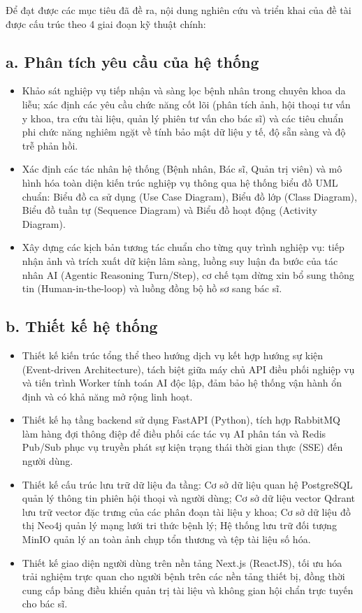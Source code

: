 Để đạt được các mục tiêu đã đề ra, nội dung nghiên cứu và triển khai của đề tài được cấu trúc theo 4 giai đoạn kỹ thuật chính:

\subsection*{a. Phân tích yêu cầu của hệ thống}
\begin{itemize}
  \item Khảo sát nghiệp vụ tiếp nhận và sàng lọc bệnh nhân trong chuyên khoa da liễu; xác định các yêu cầu chức năng cốt lõi (phân tích ảnh, hội thoại tư vấn y khoa, tra cứu tài liệu, quản lý phiên tư vấn cho bác sĩ) và các tiêu chuẩn phi chức năng nghiêm ngặt về tính bảo mật dữ liệu y tế, độ sẵn sàng và độ trễ phản hồi.
  \item Xác định các tác nhân hệ thống (Bệnh nhân, Bác sĩ, Quản trị viên) và mô hình hóa toàn diện kiến trúc nghiệp vụ thông qua hệ thống biểu đồ UML chuẩn: Biểu đồ ca sử dụng (Use Case Diagram), Biểu đồ lớp (Class Diagram), Biểu đồ tuần tự (Sequence Diagram) và Biểu đồ hoạt động (Activity Diagram).
  \item Xây dựng các kịch bản tương tác chuẩn cho từng quy trình nghiệp vụ: tiếp nhận ảnh và trích xuất dữ kiện lâm sàng, luồng suy luận đa bước của tác nhân AI (Agentic Reasoning Turn/Step), cơ chế tạm dừng xin bổ sung thông tin (Human-in-the-loop) và luồng đồng bộ hồ sơ sang bác sĩ.
\end{itemize}

\subsection*{b. Thiết kế hệ thống}
\begin{itemize}
  \item Thiết kế kiến trúc tổng thể theo hướng dịch vụ kết hợp hướng sự kiện (Event-driven Architecture), tách biệt giữa máy chủ API điều phối nghiệp vụ và tiến trình Worker tính toán AI độc lập, đảm bảo hệ thống vận hành ổn định và có khả năng mở rộng linh hoạt.
  \item Thiết kế hạ tầng backend sử dụng FastAPI (Python), tích hợp RabbitMQ làm hàng đợi thông điệp để điều phối các tác vụ AI phân tán và Redis Pub/Sub phục vụ truyền phát sự kiện trạng thái thời gian thực (SSE) đến người dùng.
  \item Thiết kế cấu trúc lưu trữ dữ liệu đa tầng: Cơ sở dữ liệu quan hệ PostgreSQL quản lý thông tin phiên hội thoại và người dùng; Cơ sở dữ liệu vector Qdrant lưu trữ vector đặc trưng của các phân đoạn tài liệu y khoa; Cơ sở dữ liệu đồ thị Neo4j quản lý mạng lưới tri thức bệnh lý; Hệ thống lưu trữ đối tượng MinIO quản lý an toàn ảnh chụp tổn thương và tệp tài liệu số hóa.
  \item Thiết kế giao diện người dùng trên nền tảng Next.js (ReactJS), tối ưu hóa trải nghiệm trực quan cho người bệnh trên các nền tảng thiết bị, đồng thời cung cấp bảng điều khiển quản trị tài liệu và không gian hội chẩn trực tuyến cho bác sĩ.
\end{itemize}

